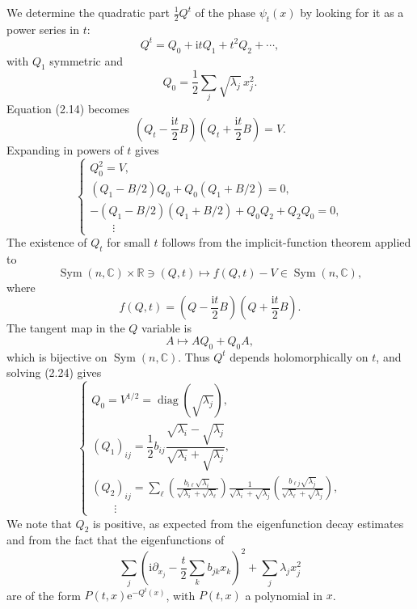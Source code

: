 \documentclass[11pt]{article}
\newcommand{\R}{\mathbb{R}}
\newcommand{\C}{\mathbb{C}}
\newcommand{\diag}{\operatorname{diag}}
\newcommand{\Sym}{\operatorname{Sym}}
\newcommand{\ii}{\mathrm{i}}
\newcommand{\e}{\mathrm{e}}
\begin{document}
We determine the quadratic part $\frac12Q^t$ of the phase $\psi_t(x)$ by looking for it as a power series in $t$:
\begin{equation}
Q^t=Q_0+\ii tQ_1+t^2Q_2+\cdots,
\tag{2.21}
\end{equation}
with $Q_1$ symmetric and
\begin{equation}
Q_0=\frac12\sum_j\sqrt{\lambda_j}\,x_j^2.
\tag{2.22}
\end{equation}
Equation (2.14) becomes
\begin{equation}
\left(Q_t-\frac{\ii t}{2}B\right)
\left(Q_t+\frac{\ii t}{2}B\right)=V.
\tag{2.23}
\end{equation}
Expanding in powers of $t$ gives
\begin{equation}
\begin{cases}
Q_0^2=V,\\
(Q_1-B/2)Q_0+Q_0(Q_1+B/2)=0,\\
-(Q_1-B/2)(Q_1+B/2)+Q_0Q_2+Q_2Q_0=0,\\
\qquad\vdots
\end{cases}
\tag{2.24}
\end{equation}
The existence of $Q_t$ for small $t$ follows from the implicit-function theorem applied to
\[
\Sym(n,\C)\times\R\ni(Q,t)\longmapsto f(Q,t)-V\in\Sym(n,\C),
\]
where
\[
f(Q,t)=\left(Q-\frac{\ii t}{2}B\right)
\left(Q+\frac{\ii t}{2}B\right).
\]
The tangent map in the $Q$ variable is
\[
A\longmapsto AQ_0+Q_0A,
\]
which is bijective on $\Sym(n,\C)$. Thus $Q^t$ depends holomorphically on $t$, and solving (2.24) gives
\begin{equation}
\begin{cases}
Q_0=V^{1/2}=\diag(\sqrt{\lambda_j}),\\[0.8ex]
(Q_1)_{ij}=\dfrac12b_{ij}
\dfrac{\sqrt{\lambda_i}-\sqrt{\lambda_j}}
{\sqrt{\lambda_i}+\sqrt{\lambda_j}},\\[1.2ex]
(Q_2)_{ij}=
\displaystyle\sum_\ell
\left(\frac{b_{i\ell}\sqrt{\lambda_i}}{\sqrt{\lambda_i}+\sqrt{\lambda_\ell}}\right)
\frac{1}{\sqrt{\lambda_i}+\sqrt{\lambda_j}}
\left(\frac{b_{\ell j}\sqrt{\lambda_j}}{\sqrt{\lambda_\ell}+\sqrt{\lambda_j}}\right),\\[0.8ex]
\qquad\vdots
\end{cases}
\tag{2.25}
\end{equation}
We note that $Q_2$ is positive, as expected from the eigenfunction decay estimates and from the fact that the eigenfunctions of
\[
\sum_j\left(\ii\partial_{x_j}-\frac t2\sum_kb_{jk}x_k\right)^2+\sum_j\lambda_jx_j^2
\]
are of the form $P(t,x)\e^{-Q^t(x)}$, with $P(t,x)$ a polynomial in $x$.
\end{document}
